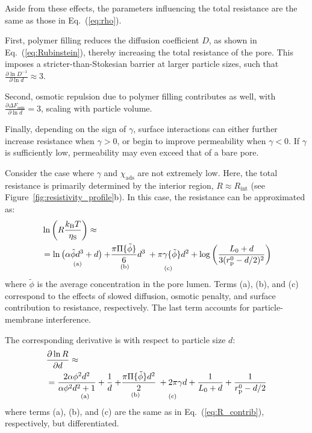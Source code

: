 \documentclass[12pt, a4paper]{article}
\begin{document}
Aside from these effects, the parameters influencing the total resistance are the same as those in Eq.~(\ref{eq:rho}).

First, polymer filling reduces the diffusion coefficient $D$, as shown in Eq.~(\ref{eq:Rubinstein}), thereby increasing the total resistance of the pore.
This imposes a stricter-than-Stokesian barrier at larger particle sizes, such that $\frac{\partial \ln D^{-1}}{\partial \ln d} \approx 3$.

Second, osmotic repulsion due to polymer filling contributes as well, with $\frac{\partial \Delta F_{\text{osm}}}{\partial \ln d} = 3$, scaling with particle volume.

Finally, depending on the sign of $\gamma$, surface interactions can either further increase resistance when $\gamma > 0$, or begin to improve permeability when $\gamma < 0$.
If $\gamma$ is sufficiently low, permeability may even exceed that of a bare pore.

Consider the case where $\gamma$ and $\chi_{\text{ads}}$ are not extremely low.
Here, the total resistance is primarily determined by the interior region, $R \approx R_{\text{int}}$ (see Figure~\ref{fig:resistivity_profile}b).
In this case, the resistance can be approximated as:
\begin{equation}
    \begin{aligned}
        &\ln \left(R \frac{k_{\text{B}} T}{\eta_{\text{S}}}\right) \approx 
        \\
        &
        =\underset{\text{(a)}}{ \ln\left(\alpha\tilde{\phi}d^3+d\right)}
        \underset{\text{(b)}}{+ \frac{\pi \Pi\{\tilde{\phi}\}}{6} d^3}
        \underset{\text{(c)}}{\vphantom{\frac{dummy}{dummy}}+ \pi \gamma\{\tilde{\phi}\} d^2}
        +  \log\left(\frac{L_0+d}{3(r_{\text{p}}^0 - d/2)^{2}}\right)
    \end{aligned}
    \label{eq:R_contrib}
\end{equation}
where $\tilde{\phi}$ is the average concentration in the pore lumen.
Terms (a), (b), and (c) correspond to the effects of slowed diffusion, osmotic penalty, and surface contribution to resistance, respectively.
The last term accounts for particle-membrane interference.

The corresponding derivative is with respect to particle size $d$:
\begin{equation}
    \begin{aligned}
        &\frac{\partial \ln R}{\partial d} \approx 
        \\
        &
        =\underset{\text{(a)}}{ \frac{2 \alpha \phi^{2} d^{2}}{\alpha \phi^{2} d^{2} + 1} +\frac{1}{d}}
        \underset{\text{(b)}}{+ \frac{\pi \Pi\{\tilde{\phi}\} d^{2}}{2}}
        \underset{\text{(c)}}{\vphantom{\frac{dummy}{dummy}}+ 2 \pi \gamma d}
        +  \frac{1}{L_0+d} + \frac{1}{r_{\text{p}}^0 - d/2}
    \end{aligned}
    \label{eq:R_contrib_deriv}
\end{equation}
where terms (a), (b), and (c) are the same as in Eq.~(\ref{eq:R_contrib}), respectively, but differentiated.
\end{document}
